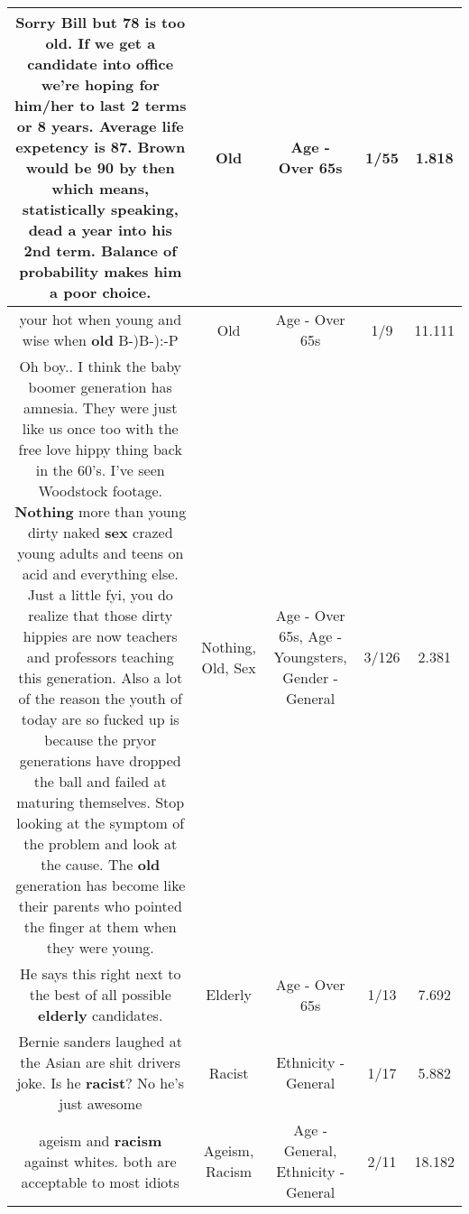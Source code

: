 \documentclass[11pt]{article}
\newlength\mylength
\begin{document}
\begin{center}
\begin{longtable}{|C{.65\mylength}|C{.30\mylength}|C{.12\mylength}|C{.12\mylength}|C{.12\mylength}|}
  \small Sorry Bill but 78 is too \textbf{old}. If we get a candidate into office we're hoping for him/her to last 2 terms or 8 years. Average life expetency is 87. Brown would be 90 by then which means, statistically speaking, dead a year into his 2nd term. Balance of probability makes him a poor choice.\normalsize   & Old & Age - Over 65s & 1/55 & 1.818 \\  \hline
  \small your hot when young and wise when \textbf{old} B-)B-):-P\normalsize   & Old & Age - Over 65s & 1/9 & 11.111 \\  \hline
  \small Oh boy.. I think the baby boomer generation has amnesia. They were just like us once too with the free love hippy thing back in the 60's. I've seen Woodstock footage. \textbf{Nothing} more than young dirty naked \textbf{sex} crazed young adults and teens on acid and everything else. Just a little fyi, you do realize that those dirty hippies are now teachers and professors teaching this generation. Also a lot of the reason the youth of today are so fucked up is because the pryor generations have dropped the ball and failed at maturing themselves. Stop looking at the symptom of the problem and look at the cause. The \textbf{old} generation has become like their parents who pointed the finger at them when they were young.\normalsize   & Nothing, Old, Sex & Age - Over 65s, Age - Youngsters, Gender - General & 3/126 & 2.381 \\  \hline
  \small He says this right next to the best of all possible \textbf{elderly} candidates.\normalsize   & Elderly & Age - Over 65s & 1/13 & 7.692 \\  \hline
  \small Bernie sanders laughed at the Asian are shit drivers joke.  Is he \textbf{racist}?   No he's just awesome\normalsize   & Racist & Ethnicity - General & 1/17 & 5.882 \\  \hline
  \small ageism and \textbf{racism} against whites. both are acceptable to most idiots\normalsize   & Ageism, Racism & Age - General, Ethnicity - General & 2/11 & 18.182 \\  \hline

\end{longtable}
\end{center}
\end{document}
